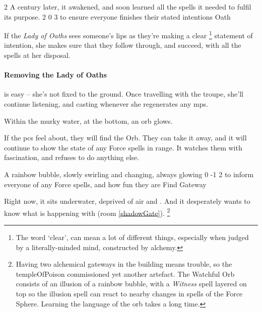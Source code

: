 \begin{multicols}{2}
{{  A century later, it awakened, and soon learned all the \glspl{spell} it needed to fulfil its purpose.}
  }%
  {2}%
  {0}%
  {3}%
  {to ensure everyone finishes their stated intentions}%
  {Oath}%
  {
    \setcounter{Fate}{2}
    \setcounter{Water}{2}
    \setcounter{Empathy}{2}
    \setcounter{Cultivation}{1}
  }%

\showStdSpells[
  \setcounter{diceNo}{0}
]

If the \textit{Lady of Oaths} sees someone's lips as they're making a clear%
\footnote{The word `clear', can mean a lot of different things, especially when judged by a literally-minded mind, constructed by \gls{alchemy}.}
statement of intention, she makes sure that they follow through, and succeed, with all the \glspl{spell} at her disposal.

\paragraph{Removing the Lady of Oaths}
is easy -- she's not fixed to the ground.
Once travelling with the troupe, she'll continue listening, and casting whenever she regenerates any \glspl{mp}.



\begin{boxtext}
  Within the murky water, at the bottom, an orb glows.
\end{boxtext}

If the \glspl{pc} feel about,
they will find the Orb.
They can take it away, and it will continue to show the state of any Force spells in range.
It watches them with fascination, and refuses to do anything else.

  {A rainbow bubble, slowly swirling and changing, always glowing}%
  {0}%
  {-1}%
  {2}%
  {to inform everyone of any Force spells, and how fun they are}%
  {Find Gateway}%
  {
    \setcounter{Air}{3}
    \setcounter{Fire}{3}
    \setcounter{Earth}{1}
    \setcounter{Academics}{2}
    \setcounter{Xenology}{2}
  }%

\showStdSpells[
  \setcounter{enc}{2}
  \findGatewaySpell
]

Right now, it sits underwater, deprived of air and .
And it desperately wants to know what is happening with  (room \vref{shadowGate}).%
\footnote{Having two alchemical gateways in the building means trouble, so the \gls{templeOfPoison} commissioned yet another \gls{artefact}.
The Watchful Orb consists of an illusion of a rainbow bubble, with a \textit{Witness} spell layered on top so the illusion spell can react to nearby changes in spells of the Force Sphere.
Learning the language of the orb takes a long time.}\null


\end{multicols}
